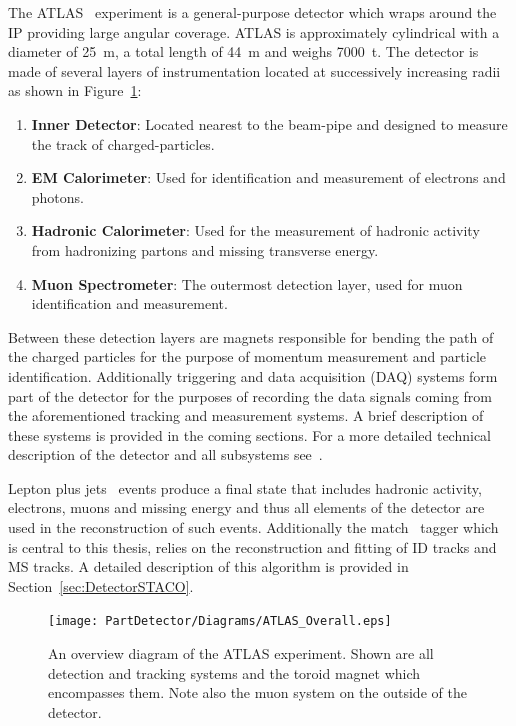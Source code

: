 The ATLAS~\cite{Detector:ATLASExperimentGeneral} experiment is a general-purpose detector which wraps around the IP providing large angular coverage. ATLAS is approximately cylindrical with a diameter of \SI{25}{\meter}, a total length of \SI{44}{\meter} and weighs \SI{7000}{\tonne}. The detector is made of several layers of instrumentation located at successively increasing radii as shown in Figure~\ref{fig:ATLASOverviewFigure}:

\begin{enumerate}
  \item \textbf{Inner Detector}: Located nearest to the beam-pipe and designed to measure the track of charged-particles.
  \item \textbf{EM Calorimeter}: Used for identification and measurement of electrons and photons.
  \item \textbf{Hadronic Calorimeter}: Used for the measurement of hadronic activity from hadronizing partons and missing transverse energy.
  \item \textbf{Muon Spectrometer}: The outermost detection layer, used for muon identification and measurement.
\end{enumerate}

Between these detection layers are magnets responsible for bending the path of the charged particles for the purpose of momentum measurement and particle identification. Additionally triggering and data acquisition (DAQ) systems form part of the detector for the purposes of recording the data signals coming from the aforementioned tracking and measurement systems. A brief description of these systems is provided in the coming sections. For a more detailed technical description of the detector and all subsystems see~\cite{Detector:ATLAS_TDR_vol1}.

Lepton plus jets \ttbar\ events produce a final state that includes hadronic activity, electrons, muons and missing energy and thus all elements of the detector are used in the reconstruction of such events. Additionally the match \xsm\ tagger which is central to this thesis, relies on the reconstruction and fitting of ID tracks and MS tracks. A detailed description of this algorithm is provided in Section~\ref{sec:DetectorSTACO}.

\begin{figure}[htbp]
  \centering
    \texttt{[image: PartDetector/Diagrams/ATLAS\_Overall.eps]}
    \caption{An overview diagram of the ATLAS experiment. Shown are all detection and tracking systems and the toroid magnet which encompasses them. Note also the muon system on the outside of the detector.}
  \label{fig:ATLASOverviewFigure}
\end{figure}

